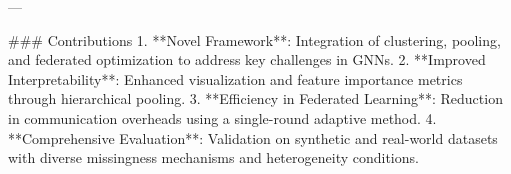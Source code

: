 ---

### Contributions  
1. **Novel Framework**: Integration of clustering, pooling, and federated optimization to address key challenges in GNNs.
2. **Improved Interpretability**: Enhanced visualization and feature importance metrics through hierarchical pooling.
3. **Efficiency in Federated Learning**: Reduction in communication overheads using a single-round adaptive method.
4. **Comprehensive Evaluation**: Validation on synthetic and real-world datasets with diverse missingness mechanisms and heterogeneity conditions.